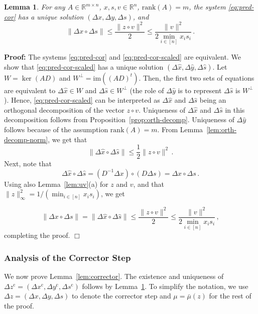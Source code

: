 \documentclass[12pt, showidx, twoside]{article}
\newtheorem{lemma}[satz]{Lemma}
\def\prove{\par \noindent \hbox{\bf Proof:}\quad}
\def\endproof{\hfill{$\Box$}}
\def\N{\mathbb{N}}
\def\R{\mathbb{R}}
\def\gap{\bar{\mu}}
\def\N{\mathcal{N}}
\def\co{^\mathrm{c}}
\begin{document}
{{{\begin{lemma}\label{lem:main-orth-decomp}
For any $A\in\R^{m\times n}$, $x,s,v\in\R^n$, $\mathrm{rank}(A)=m$,
the system \eqref{eq:pred-cor} has a unique solution $(\Delta x,\Delta y,\Delta s)$, 
and 
\[
    \|\Delta  x\circ \Delta  s\|\le \frac{\|z\circ v\|^2}{2}\le \frac{\|v\|^2}{2\min_{i\in[n]}{x_is_i}}\, .
\]
\end{lemma}
\prove
The systems \eqref{eq:pred-cor} and \eqref{eq:pred-cor-scaled} are equivalent. We show that  \eqref{eq:pred-cor-scaled} has a unique solution 
$(\Delta \hat x,\Delta \hat y,\Delta \hat s)$.
Let $W=\ker(AD)$ and $W^\perp=\mathrm{im}((AD)^t)$. Then, the first two sets of equations are equivalent to $\Delta \hat x\in W$ and $\Delta \hat s\in W^\perp$ (the role of $\Delta \hat y$ is to represent $\Delta \hat s$ is $W^\perp$).
 Hence, \eqref{eq:pred-cor-scaled} can be interpreted as $\Delta \hat x$ and $\Delta \hat s$ being an orthogonal decomposition of the vector $z\circ v$. Uniqueness of $\Delta\hat x$ and $\Delta \hat s$ in this decomposition follows from
 Proposition~\ref{prop:orth-decomp}. Uniqueness of $\Delta\hat y$ follows because of the assumption $\mathrm{rank}(A)=m$. From Lemma~\ref{lem:orth-decomp-norm}, we get that
 \[
       \|\Delta  \hat x\circ \Delta \hat s\|\le \frac{1}{2}\|z\circ v\|^2\, .
 \]
Next, note that
 \[
   \Delta  \hat x\circ \Delta \hat s=(D^{-1}\Delta x)\circ (D\Delta s)=\Delta x\circ \Delta s\, .
 \]
 Using also  
 Lemma~\ref{lem:uv}(a) for $z$ and $v$,
 and  that $\|z\|_\infty^2=1/(\min_{i\in [n]}x_is_i)$, we get

\[
    \|\Delta x\circ \Delta s\|=\|\Delta  \hat x\circ \Delta \hat s\|\le \frac{\|z\circ v\|^2}{2}\le \frac{\|v\|^2}{2\min_{i\in [n]}x_is_i}\, ,
\]
completing the proof. 
  \endproof
\subsubsection{Analysis of the Corrector Step}
We now prove Lemma~\ref{lem:corrector}. The existence and uniqueness of
$\Delta z\co=(\Delta x\co,\Delta y\co,\Delta s\co)$ follows by
Lemma~\ref{lem:main-orth-decomp}. To simplify the notation, we use $\Delta z=(\Delta x,\Delta y,\Delta s)$ to denote the corrector step and $\mu=\gap(z)$ for the rest of the proof.

}}}
\end{document}
